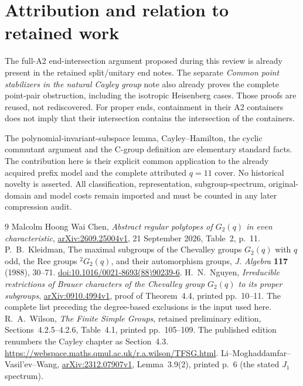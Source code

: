 \documentclass[11pt]{article}
\begin{document}
\section{Attribution and relation to retained work}

The full-A2 end-intersection argument proposed during this review is
already present in the retained split/unitary end notes. The separate
\emph{Common point stabilizers in the natural Cayley group} note also
already proves the complete point-pair obstruction, including the
isotropic Heisenberg cases. Those proofs are reused, not rediscovered.
For proper ends, containment in their A2 containers does not imply that
their intersection contains the intersection of the containers.

The polynomial-invariant-subspace lemma, Cayley--Hamilton, the cyclic
commutant argument and the C-group definition are elementary standard
facts. The contribution here is their explicit common application to the
already acquired prefix model and the complete attributed $q=11$ cover.
No historical novelty is asserted. All classification, representation,
subgroup-spectrum, original-domain and model costs remain imported and
must be counted in any later compression audit.
\begin{thebibliography}{9}
 Malcolm Hoong Wai Chen,
\emph{Abstract regular polytopes of $G_2(q)$ in even characteristic},
\href{https://arxiv.org/abs/2609.25004v1}{arXiv:2609.25004v1},
21 September 2026, Table~2, p.~11.
 P.~B.~Kleidman,
The maximal subgroups of the Chevalley groups $G_2(q)$ with $q$ odd,
the Ree groups ${}^2G_2(q)$, and their automorphism groups,
\emph{J. Algebra} \textbf{117} (1988), 30--71.
\href{https://doi.org/10.1016/0021-8693(88)90239-6}{doi:10.1016/0021-8693(88)90239-6}.
 H.~N.~Nguyen,
\emph{Irreducible restrictions of Brauer characters of the Chevalley group
$G_2(q)$ to its proper subgroups},
\href{https://arxiv.org/pdf/0910.4994}{arXiv:0910.4994v1},
proof of Theorem~4.4, printed pp.~10--11.
The complete list preceding the degree-based exclusions is the input used here.
 R.~A.~Wilson, \emph{The Finite Simple Groups}, retained
preliminary edition, Sections~4.2.5--4.2.6, Table~4.1, printed pp.~105--109.
The published edition renumbers the Cayley chapter as Section~4.3.
\url{https://webspace.maths.qmul.ac.uk/r.a.wilson/TFSG.html}.
 Li--Moghaddamfar--Vasil'ev--Wang,
\href{https://arxiv.org/pdf/2312.07907v1}{arXiv:2312.07907v1},
Lemma~3.9(2), printed p.~6 (the stated $J_1$ spectrum).
\end{thebibliography}
\end{document}
